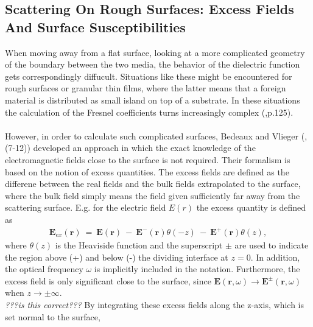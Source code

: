 \subsection{Scattering On Rough Surfaces: Excess Fields And Surface Susceptibilities}
When moving away from a flat surface, looking at a more complicated geometry of the boundary 
between the two media, the behavior of the dielectric function gets correspondingly diffucult.
Situations like these might be encountered for rough surfaces or granular thin films, where the latter
means that a foreign material is distributed as small island on top of a substrate. 
In these situations the calculation of the Fresnel coefficients turns increasingly complex (\cite{Lazzari2002},p.125).
\\
\\
However, in order to calculate such complicated surfaces, 
Bedeaux and Vlieger (\cite{Lazzari2002}, (7-12)) developed an approach in which the exact knowledge
of the electromagnetic fields close to the surface is not required. Their formalism is based on the notion 
of excess quantities. 
The excess fields are defined as the differene between the real fields and the bulk fields extrapolated
to the surface, where the bulk field simply means the field given sufficiently far away from the
scattering surface. E.g. for the electric field $E(r)$ the excess quantity is defined as
%
\begin{align}
   \label{excessField1}
   \boldsymbol{E}_{ex} (\boldsymbol{r}) \:=\: \boldsymbol{E}(\boldsymbol{r}) 
   \:-\: \boldsymbol{E}^-(\boldsymbol{r})\theta(-z) \:-\: \boldsymbol{E}^+(\boldsymbol{r})\theta(z),
\end{align}
%
where $\theta(z)$ is the Heaviside function and the superscript $\pm$ are used to indicate the region
above (+) and below (-) the dividing interface at $z = 0$. In addition, the optical frequency $\omega$
is implicitly included in the notation. Furthermore, the excess field is only significant close
to the surface, since $\boldsymbol{E}(\boldsymbol{r},\omega) \rightarrow 
\boldsymbol{E}^{\pm}(\boldsymbol{r},\omega)$ when $z \rightarrow \pm \infty$. \\
\textit{???is this correct???}
By integrating these excess fields along the z-axis, which is set normal to the surface,
%
